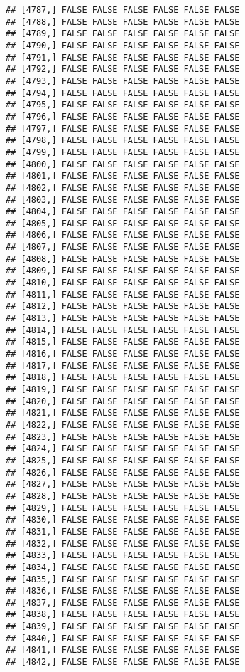 \documentclass[
]{article}
\begin{document}
\begin{verbatim}
## [4787,] FALSE FALSE FALSE FALSE FALSE FALSE
## [4788,] FALSE FALSE FALSE FALSE FALSE FALSE
## [4789,] FALSE FALSE FALSE FALSE FALSE FALSE
## [4790,] FALSE FALSE FALSE FALSE FALSE FALSE
## [4791,] FALSE FALSE FALSE FALSE FALSE FALSE
## [4792,] FALSE FALSE FALSE FALSE FALSE FALSE
## [4793,] FALSE FALSE FALSE FALSE FALSE FALSE
## [4794,] FALSE FALSE FALSE FALSE FALSE FALSE
## [4795,] FALSE FALSE FALSE FALSE FALSE FALSE
## [4796,] FALSE FALSE FALSE FALSE FALSE FALSE
## [4797,] FALSE FALSE FALSE FALSE FALSE FALSE
## [4798,] FALSE FALSE FALSE FALSE FALSE FALSE
## [4799,] FALSE FALSE FALSE FALSE FALSE FALSE
## [4800,] FALSE FALSE FALSE FALSE FALSE FALSE
## [4801,] FALSE FALSE FALSE FALSE FALSE FALSE
## [4802,] FALSE FALSE FALSE FALSE FALSE FALSE
## [4803,] FALSE FALSE FALSE FALSE FALSE FALSE
## [4804,] FALSE FALSE FALSE FALSE FALSE FALSE
## [4805,] FALSE FALSE FALSE FALSE FALSE FALSE
## [4806,] FALSE FALSE FALSE FALSE FALSE FALSE
## [4807,] FALSE FALSE FALSE FALSE FALSE FALSE
## [4808,] FALSE FALSE FALSE FALSE FALSE FALSE
## [4809,] FALSE FALSE FALSE FALSE FALSE FALSE
## [4810,] FALSE FALSE FALSE FALSE FALSE FALSE
## [4811,] FALSE FALSE FALSE FALSE FALSE FALSE
## [4812,] FALSE FALSE FALSE FALSE FALSE FALSE
## [4813,] FALSE FALSE FALSE FALSE FALSE FALSE
## [4814,] FALSE FALSE FALSE FALSE FALSE FALSE
## [4815,] FALSE FALSE FALSE FALSE FALSE FALSE
## [4816,] FALSE FALSE FALSE FALSE FALSE FALSE
## [4817,] FALSE FALSE FALSE FALSE FALSE FALSE
## [4818,] FALSE FALSE FALSE FALSE FALSE FALSE
## [4819,] FALSE FALSE FALSE FALSE FALSE FALSE
## [4820,] FALSE FALSE FALSE FALSE FALSE FALSE
## [4821,] FALSE FALSE FALSE FALSE FALSE FALSE
## [4822,] FALSE FALSE FALSE FALSE FALSE FALSE
## [4823,] FALSE FALSE FALSE FALSE FALSE FALSE
## [4824,] FALSE FALSE FALSE FALSE FALSE FALSE
## [4825,] FALSE FALSE FALSE FALSE FALSE FALSE
## [4826,] FALSE FALSE FALSE FALSE FALSE FALSE
## [4827,] FALSE FALSE FALSE FALSE FALSE FALSE
## [4828,] FALSE FALSE FALSE FALSE FALSE FALSE
## [4829,] FALSE FALSE FALSE FALSE FALSE FALSE
## [4830,] FALSE FALSE FALSE FALSE FALSE FALSE
## [4831,] FALSE FALSE FALSE FALSE FALSE FALSE
## [4832,] FALSE FALSE FALSE FALSE FALSE FALSE
## [4833,] FALSE FALSE FALSE FALSE FALSE FALSE
## [4834,] FALSE FALSE FALSE FALSE FALSE FALSE
## [4835,] FALSE FALSE FALSE FALSE FALSE FALSE
## [4836,] FALSE FALSE FALSE FALSE FALSE FALSE
## [4837,] FALSE FALSE FALSE FALSE FALSE FALSE
## [4838,] FALSE FALSE FALSE FALSE FALSE FALSE
## [4839,] FALSE FALSE FALSE FALSE FALSE FALSE
## [4840,] FALSE FALSE FALSE FALSE FALSE FALSE
## [4841,] FALSE FALSE FALSE FALSE FALSE FALSE
## [4842,] FALSE FALSE FALSE FALSE FALSE FALSE

\end{verbatim}
\end{document}
